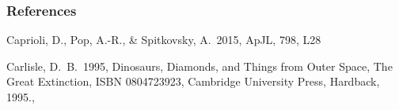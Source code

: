 \documentclass{beamer}
\begin{document}
\begin{frame}
\frametitle{References}   

\begin{thebibliography}{}
 Caprioli, D., Pop, A.-R., \& Spitkovsky, A.\ 2015, ApJL, 798, L28

 Carlisle, D.~B.\ 1995, 
Dinosaurs, Diamonds, and Things from Outer Space, The Great Extinction, 
ISBN 0804723923, Cambridge University Press, Hardback, 1995.,  
\end{thebibliography}

\end{frame}
\end{document}
